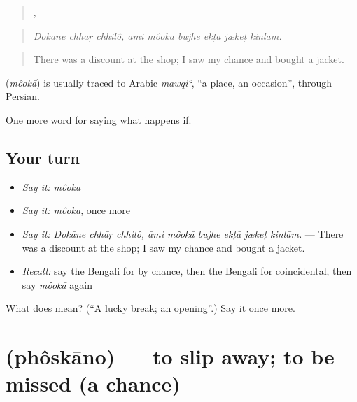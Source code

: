 \begin{quote}
  ,      
\end{quote}

\begin{quote}
\emph{Dokāne chhāṛ chhilô, āmi môokā bujhe ekṭā jækeṭ kinlām.}
\end{quote}

\begin{quote}
There was a discount at the shop; I saw my chance and bought a jacket.
\end{quote}

\begin{cousinweb}
\textbf{} (\emph{môokā}) is usually traced to Arabic \emph{mawqiʿ}, \textquotedblleft{}a place, an occasion\textquotedblright{}, through Persian.
\end{cousinweb}

\begin{grammarlens}[title={What you've built}]
One more word for saying what happens if.
\end{grammarlens}

\subsection*{Your turn}
\begin{itemize}
\raggedright
  \item \emph{Say it:} \emph{môokā}
  \item \emph{Say it:} \emph{môokā}, once more
  \item \emph{Say it:} \emph{Dokāne chhāṛ chhilô, āmi môokā bujhe ekṭā jækeṭ kinlām.} — There was a discount at the shop; I saw my chance and bought a jacket.
  \item \emph{Recall:} say the Bengali for by chance, then the Bengali for coincidental, then say \emph{môokā} again
\end{itemize}

\begin{tcolorbox}[breakable,colback=teal!4,colframe=teal!35!black,title={Before you move on}]
What does  mean? (\textquotedblleft{}A lucky break; an opening\textquotedblright{}.) Say it once more.
\end{tcolorbox}
\section[\texorpdfstring{\bn{ফসকানো} (phôskāno)}{ফসকানো (phôskāno)}]{ (phôskāno) — to slip away; to be missed (a chance)}

